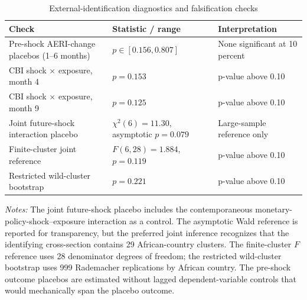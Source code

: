 \begin{table}[htbp]\centering
\caption{External-identification diagnostics and falsification checks}
\label{tab:external_id_diagnostics}
\begin{singlespace}\scriptsize
\setlength{\tabcolsep}{3pt}
\begin{tabular}{@{}p{4.5cm}p{3.4cm}p{4.8cm}@{}}
\toprule
Check & Statistic / range & Interpretation\\
\midrule
Pre-shock AERI-change placebos (1--6 months) & $p\in[0.156,0.807]$ & None significant at 10 percent\\
CBI shock $\times$ exposure, month 4 & $p=0.153$ & p-value above 0.10\\
CBI shock $\times$ exposure, month 9 & $p=0.125$ & p-value above 0.10\\
Joint future-shock interaction placebo & $\chi^2(6)=11.30$, asymptotic $p=0.079$ & Large-sample reference only\\
Finite-cluster joint reference & $F(6,28)=1.884$, $p=0.119$ & p-value above 0.10\\
Restricted wild-cluster bootstrap & $p=0.221$ & p-value above 0.10\\
\bottomrule
\end{tabular}
\end{singlespace}
\begin{singlespace}\footnotesize\textit{Notes:} The joint future-shock placebo includes the contemporaneous monetary-policy-shock--exposure interaction as a control. The asymptotic Wald reference is reported for transparency, but the preferred joint inference recognizes that the identifying cross-section contains 29 African-country clusters. The finite-cluster $F$ reference uses 28 denominator degrees of freedom; the restricted wild-cluster bootstrap uses 999 Rademacher replications by African country. The pre-shock outcome placebos are estimated without lagged dependent-variable controls that would mechanically span the placebo outcome.\end{singlespace}
\end{table}
